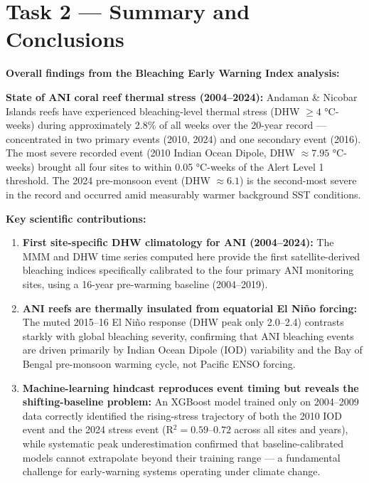 \documentclass[12pt,a4paper]{report}
\begin{document}
\section{Task 2 --- Summary and Conclusions}
\label{sec:task2_summary}

\begin{findingbox}
\textbf{Overall findings from the Bleaching Early Warning Index analysis:}

\vspace{6pt}
\textbf{State of ANI coral reef thermal stress (2004--2024):}
Andaman \& Nicobar Islands reefs have experienced bleaching-level thermal stress
(DHW $\geq 4$ °C-weeks) during approximately 2.8\% of all weeks over the 20-year
record — concentrated in two primary events (2010, 2024) and one secondary event
(2016). The most severe recorded event (2010 Indian Ocean Dipole, DHW $\approx 7.95$
°C-weeks) brought all four sites to within 0.05 °C-weeks of the Alert Level 1
threshold. The 2024 pre-monsoon event (DHW $\approx 6.1$) is the second-most severe
in the record and occurred amid measurably warmer background SST conditions.

\vspace{6pt}
\textbf{Key scientific contributions:}
\begin{enumerate}[leftmargin=*, nosep]
  \item \textbf{First site-specific DHW climatology for ANI (2004--2024):}
  The MMM and DHW time series computed here provide the first satellite-derived
  bleaching indices specifically calibrated to the four primary ANI monitoring sites,
  using a 16-year pre-warming baseline (2004--2019).

  \item \textbf{ANI reefs are thermally insulated from equatorial El Niño forcing:}
  The muted 2015--16 El Niño response (DHW peak only 2.0--2.4) contrasts starkly with
  global bleaching severity, confirming that ANI bleaching events are driven primarily
  by Indian Ocean Dipole (IOD) variability and the Bay of Bengal pre-monsoon warming
  cycle, not Pacific ENSO forcing.

  \item \textbf{Machine-learning hindcast reproduces event timing but reveals the
  shifting-baseline problem:} An XGBoost model trained only on 2004--2009 data
  correctly identified the rising-stress trajectory of both the 2010 IOD event and
  the 2024 stress event (R$^2 = 0.59$--$0.72$ across all sites and years), while
  systematic peak underestimation confirmed that baseline-calibrated models cannot
  extrapolate beyond their training range --- a fundamental challenge for early-warning
  systems operating under climate change.
\end{enumerate}


\end{findingbox}
\end{document}
